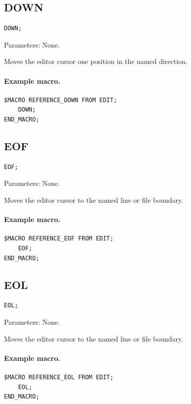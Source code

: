 \documentclass[a4paper,10pt,twoside,openany]{book}
\begin{document}
\subsection*{DOWN}
\begin{verbatim}
DOWN;
\end{verbatim}
Parameters: None.

Moves the editor cursor one position in the named direction.

\paragraph{Example macro.}
\begin{verbatim}
$MACRO REFERENCE_DOWN FROM EDIT;
    DOWN;
END_MACRO;
\end{verbatim}

\label{prim:procedure-eof}
\subsection*{EOF}
\begin{verbatim}
EOF;
\end{verbatim}
Parameters: None.

Moves the editor cursor to the named line or file boundary.

\paragraph{Example macro.}
\begin{verbatim}
$MACRO REFERENCE_EOF FROM EDIT;
    EOF;
END_MACRO;
\end{verbatim}

\label{prim:procedure-eol}
\subsection*{EOL}
\begin{verbatim}
EOL;
\end{verbatim}
Parameters: None.

Moves the editor cursor to the named line or file boundary.

\paragraph{Example macro.}
\begin{verbatim}
$MACRO REFERENCE_EOL FROM EDIT;
    EOL;
END_MACRO;
\end{verbatim}
\end{document}
